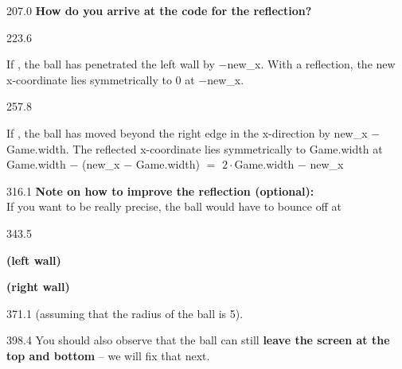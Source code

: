 \documentclass{aslab}
\newcommand*\bl[1]{\textcolor{aslabblue}{#1}}
\begin{document}
\begin{region}[x=74.7,right=0]{207.0}
\textbf{How do you arrive at the code for the reflection?}
\end{region}

\begin{region}[x=74.7,right=0,pitch=17.1]{223.6}
\begin{alist}
\item If , the ball has penetrated the left wall by
  \bl{$-$new\_x}. With a reflection, the new x-coordinate lies symmetrically
  to \bl{$0$} at \bl{$-$new\_x}.
\end{alist}
\end{region}

\begin{region}[x=74.7,right=0,pitch=14.6]{257.8}
\begin{alist}[start=2]
\item If , the ball has moved beyond the right edge
  in the x-direction by \bl{new\_x $-$ Game.width}. The reflected
  x-coordinate lies symmetrically to \bl{Game.width} at\\
  \bl{Game.width $-$ (new\_x $-$ Game.width) $=$ $2\cdot{}$Game.width $-$
  new\_x}
\end{alist}
\end{region}

\begin{region}[x=74.7,right=0,pitch=13.3]{316.1}
\textbf{Note on how to improve the reflection (optional):}\\
If you want to be really precise, the ball would have to bounce off at
\end{region}

\begin{region}[x=74.7,right=0,pitch=14.3]{343.5}
\begin{ntasks}[start=3]
\item {} \textbf{(left wall)}
\item {} \textbf{(right wall)}
\end{ntasks}
\end{region}

\begin{region}[x=74.7,right=0]{371.1}
(assuming that the radius of the ball is 5).
\end{region}

\begin{region}[x=74.7,right=0,pitch=14.2]{398.4}
You should also observe that the ball can still \textbf{leave the screen at
the top and bottom} -- we will fix that next.
\end{region}
\end{document}
